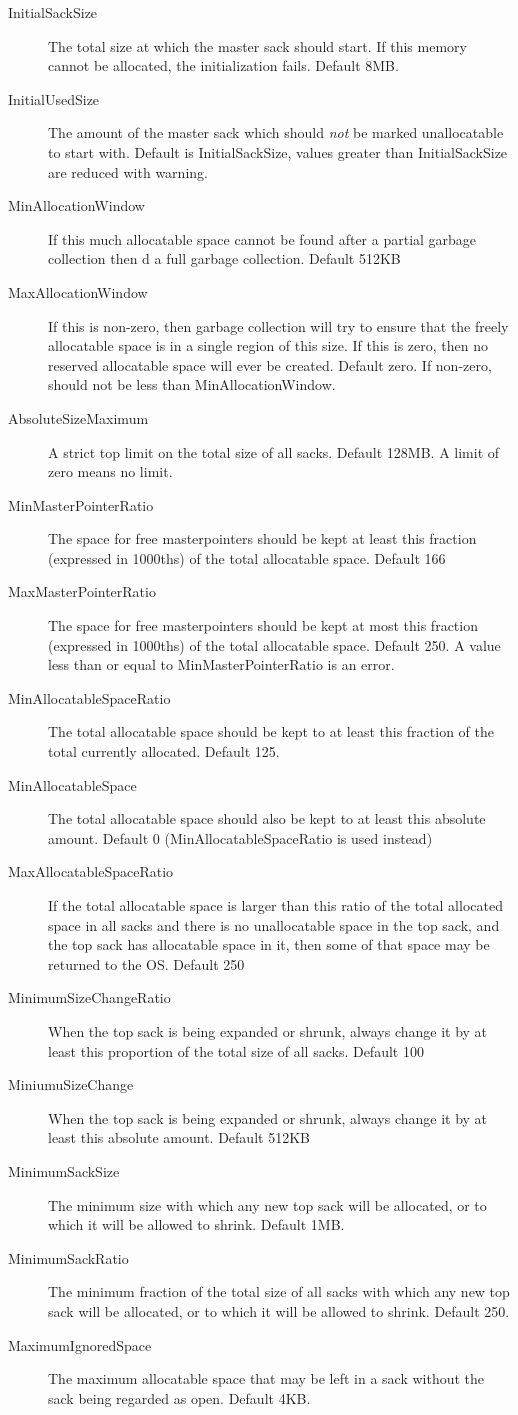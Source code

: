 \documentclass[12pt]{article}
\newcommand{\bd}{\begin{description}}
\newcommand{\ed}{\end{description}}
\begin{document}
\bd
\item[InitialSackSize] The total size at which the master sack should
start. If this memory cannot be allocated, the initialization
fails. Default 8MB.
\item[InitialUsedSize] The amount of the master sack which should
\emph{not} be marked unallocatable to start with. Default is
InitialSackSize, values greater than InitialSackSize are reduced with
warning.
\item[MinAllocationWindow] If this much allocatable space cannot be found
after a partial garbage collection then d a full garbage
collection. Default 512KB
\item[MaxAllocationWindow] If this is non-zero, then garbage collection
will try to ensure that the freely allocatable space is in a single
region of this size. If this is zero, then no 
reserved allocatable space will ever be created. Default zero. If
non-zero, should not be less than MinAllocationWindow.
\item[AbsoluteSizeMaximum] A strict top limit on the total size of all
sacks. Default 128MB. A limit of zero means no limit.
\item[MinMasterPointerRatio] The space for free masterpointers should
be kept at least this fraction (expressed in 1000ths) of the total
allocatable space. Default 166
\item[MaxMasterPointerRatio] The space for free masterpointers should
be kept at most this fraction (expressed in 1000ths) of the total
allocatable space. Default 250. A value less than or equal to
MinMasterPointerRatio is an error.
\item[MinAllocatableSpaceRatio] The total allocatable space should be
kept to at least this fraction of the total currently
allocated. Default 125.
\item[MinAllocatableSpace] The total allocatable space should also be
kept to at least this absolute amount. Default 0
(MinAllocatableSpaceRatio is used instead)
\item[MaxAllocatableSpaceRatio] If the total allocatable space is
larger than this ratio of the total allocated space in all sacks and
there is no unallocatable space in the top sack, and the top sack has
allocatable space in it, then some of that space may be returned to
the OS. Default 250
\item[MinimumSizeChangeRatio] When the top sack is being expanded or
shrunk, always change it by at least this proportion of the total size 
of all sacks. Default 100
\item[MiniumuSizeChange]  When the top sack is being expanded or
shrunk, always change it by at least this absolute amount. Default
512KB
\item[MinimumSackSize] The minimum size with which any new top sack will be
allocated, or to which it will be allowed to shrink. Default 1MB.
\item[MinimumSackRatio] The minimum fraction of the total size of all
sacks with which any new top sack will be
allocated, or to which it will be allowed to shrink. Default 250.
\item[MaximumIgnoredSpace] The maximum allocatable space that may be
left in a sack without the sack being regarded as open. Default 4KB.
\ed
\end{document}
